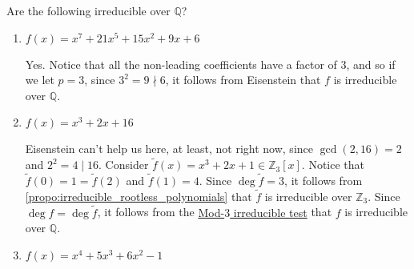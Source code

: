 \documentclass[notoc,notitlepage,nobib]{tufte-book}
\begin{document}
\begin{eg}\label{eg:examples_of_irreducible_polynomials}
  Are the following irreducible over $\mathbb{Q}$?
  \begin{enumerate}
    \item $f(x) = x^7 + 21 x^5 + 15x^2 + 9x + 6$

      Yes. Notice that all the non-leading coefficients have a factor of $3$, and so if we let
      $p = 3$, since $3^2 = 9 \nmid 6$, it follows from Eisenstein that $f$ is irreducible over
      $\mathbb{Q}$.

    \item $f(x) = x^3 + 2x + 16$

      Eisenstein can't help us here, at least, not right now, since $\gcd(2, 16)
      = 2$ and $2^2 = 4 \mid 16$. Consider $\tilde{f}(x) = x^3 + 2x + 1 \in
      \mathbb{Z}_3[x]$. Notice that $\tilde{f}(0) = 1 = \tilde{f}(2)$ and
      $\tilde{f}(1) = 4$. Since $\deg \tilde{f} = 3$, it follows from
      \cref{propo:irreducible_rootless_polynomials} that $\tilde{f}$ is
      irreducible over $\mathbb{Z}_3$. Since $\deg f = \deg \tilde{f}$, it follows
      from the \hyperref[propo:mod_p_irreducibility_test]{Mod-$3$ irreducible
      test} that $f$ is irreducible over $\mathbb{Q}$. 

    \item $f(x) = x^4 + 5x^3 + 6x^2 - 1$


\end{enumerate}
\end{eg}
\end{document}
